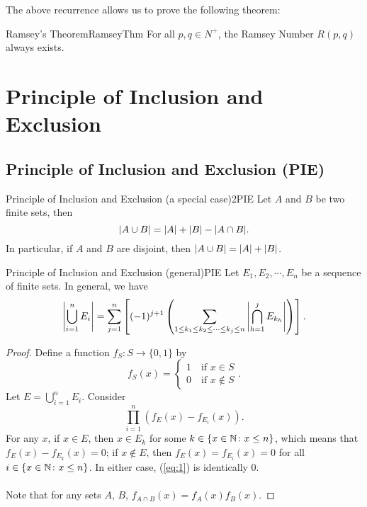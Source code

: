 \documentclass[math]{amznotes}
\theoremstyle{remark}
\begin{document}
The above recurrence allows us to prove the following theorem:
\begin{thmbox}{Ramsey's Theorem}{RamseyThm}
    For all $p, q \in N^+$, the Ramsey Number $R(p, q)$ always exists.
\end{thmbox}

\chapter{Principle of Inclusion and Exclusion}
\section{Principle of Inclusion and Exclusion (PIE)}
\begin{thmbox}{Principle of Inclusion and Exclusion (a special case)}{2PIE}
    Let $A$ and $B$ be two finite sets, then
    \begin{equation*}
        {\left\lvert {A \cup B} \right\rvert} = {\left\lvert {A} \right\rvert} + {\left\lvert {B} \right\rvert} - {\left\lvert {A \cap B} \right\rvert}.
    \end{equation*}
    In particular, if $A$ and $B$ are disjoint, then ${\left\lvert {A \cup B} \right\rvert} = {\left\lvert {A} \right\rvert} + {\left\lvert {B} \right\rvert}$.
\end{thmbox}
\begin{thmbox}{Principle of Inclusion and Exclusion (general)}{PIE}
    Let $E_1, E_2, \cdots, E_n$ be a sequence of finite sets. In general, we have
    \begin{equation*}
        {\left\lvert {\bigcup_{i = 1}^n E_i} \right\rvert} = \sum_{j = 1}^{n} \left[(-1)^{j + 1}\left(\sum_{1 \leq k_1 \leq k_2 \leq \cdots \leq k_j \leq n}{\left\lvert {\bigcap_{h = 1}^{j}E_{k_h}} \right\rvert}\right)\right].
    \end{equation*}
    \tcblower
    \begin{proof}
        Define a function $f_S \colon S \to \{0, 1\}$ by
        \begin{equation*}
            f_S(x) = \begin{cases}
                1 \quad \textrm{if } x \in S \\
                0 \quad \textrm{if } x \notin S
            \end{cases}.
        \end{equation*}
        Let $E = \bigcup_{i = 1}^n E_i$. Consider
        \begin{equation}\label{eq:1}
            \prod_{i = 1}^{n}\left(f_E(x) - f_{E_i}(x)\right). \tag{*}
        \end{equation}
        For any $x$, if $x \in E$, then $x \in E_k$ for some $k \in \left\{x \in \mathbb{N} \colon x \leq n\right\}$, which means that $f_E(x) - f_{E_k}(x) = 0$; if $x \notin E$, then $f_E(x) = f_{E_i}(x) = 0$ for all $i \in \left\{x \in \mathbb{N} \colon x \leq n\right\}$. In either case, (\ref{eq:1}) is identically $0$.
        \\\\
        Note that for any sets $A$, $B$, $f_{A \cap B}(x) = f_A(x)f_B(x)$.
    \end{proof}
\end{thmbox}
\end{document}
